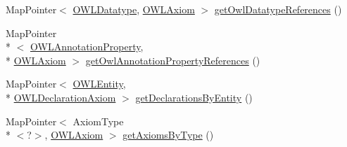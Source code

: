 \begin{DoxyCompactItemize}
\item 
Map\-Pointer$<$ \hyperlink{interfaceorg_1_1semanticweb_1_1owlapi_1_1model_1_1_o_w_l_datatype}{O\-W\-L\-Datatype}, \hyperlink{interfaceorg_1_1semanticweb_1_1owlapi_1_1model_1_1_o_w_l_axiom}{O\-W\-L\-Axiom} $>$ \hyperlink{classuk_1_1ac_1_1manchester_1_1cs_1_1owl_1_1owlapi_1_1_internals_impl_aed38ae99994a2e6c3e3816641bf0e71c}{get\-Owl\-Datatype\-References} ()
\item 
Map\-Pointer\\*
$<$ \hyperlink{interfaceorg_1_1semanticweb_1_1owlapi_1_1model_1_1_o_w_l_annotation_property}{O\-W\-L\-Annotation\-Property}, \\*
\hyperlink{interfaceorg_1_1semanticweb_1_1owlapi_1_1model_1_1_o_w_l_axiom}{O\-W\-L\-Axiom} $>$ \hyperlink{classuk_1_1ac_1_1manchester_1_1cs_1_1owl_1_1owlapi_1_1_internals_impl_a5dee4e3e71b4b438152e4b9620d8e29d}{get\-Owl\-Annotation\-Property\-References} ()
\item 
Map\-Pointer$<$ \hyperlink{interfaceorg_1_1semanticweb_1_1owlapi_1_1model_1_1_o_w_l_entity}{O\-W\-L\-Entity}, \\*
\hyperlink{interfaceorg_1_1semanticweb_1_1owlapi_1_1model_1_1_o_w_l_declaration_axiom}{O\-W\-L\-Declaration\-Axiom} $>$ \hyperlink{classuk_1_1ac_1_1manchester_1_1cs_1_1owl_1_1owlapi_1_1_internals_impl_a007971d020667916318da5d0392328d7}{get\-Declarations\-By\-Entity} ()
\item 
Map\-Pointer$<$ Axiom\-Type\\*
$<$?$>$, \hyperlink{interfaceorg_1_1semanticweb_1_1owlapi_1_1model_1_1_o_w_l_axiom}{O\-W\-L\-Axiom} $>$ \hyperlink{classuk_1_1ac_1_1manchester_1_1cs_1_1owl_1_1owlapi_1_1_internals_impl_a7266199fff93de4e0c90f2c184c1a3b4}{get\-Axioms\-By\-Type} ()
\end{DoxyCompactItemize}
